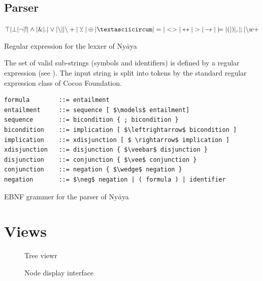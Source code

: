 \subsection{Parser}


\cite{Louden:1997:CCP:523017}

\begin{table}[htdp]
\begin{center}
$\top | \bot 
| \neg | !
| \wedge | \& | .
| \vee | {\setminus}| | {\setminus}+ 
| \veebar | \oplus | \textasciicircum
| = | <> | \leftrightarrow 
| > | \rightarrow | \models
| ( | ) | , | ; 
| {\setminus}w+$ 
\caption{Regular expression for the lexxer of Ny$\bar{a}$ya}
\label{tab:REGEX}
\end{center}
\end{table}


The set of valid sub-strings (symbols and identifiers) is defined by a regular expression (see ). 
The input string is split into tokens by the standard regular expression class of Cocoa Foundation.

\begin{table}[htdp]
\begin{center}
\begin{lstlisting}[mathescape]
formula        ::= entailment
entailment     ::= sequence [ $\models$ entailment]
sequence       ::= bicondition { ; bicondition } 
bicondition    ::= implication [ $\leftrightarrow$ bicondition ]
implication    ::= xdisjunction [ $ \rightarrow$ implication ]
xdisjunction   ::= disjunction { $\veebar$ disjunction }
disjunction    ::= conjunction { $\vee$ conjunction }
conjunction    ::= negation { $\wedge$ negation }
negation       ::= $\neg$ negation | ( formula ) | identifier
\end{lstlisting}
\caption{EBNF grammer for the parser of Ny$\bar{a}$ya}
\label{tab:EBNF}
\end{center}
\end{table}


\section{Views}

\begin{figure}[htbp]
\begin{center}
\caption{Tree viewr}
\label{fig:TreeView}
\end{center}
\end{figure}

\begin{figure}[htbp]
\begin{center}
\caption{Node display interface}
\label{fig:NyayaNodeDisplay}
\end{center}
\end{figure}


